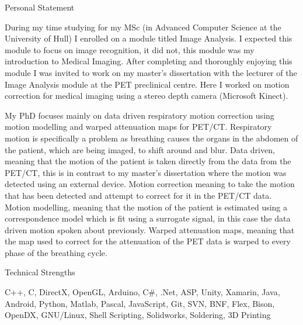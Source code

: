 \documentclass{cv}
\begin{document}
\begin{rSection}{Personal Statement}

\vspace{-0.2cm}

\item During my time studying for my MSc (in Advanced Computer Science at the University of Hull) I enrolled on a module titled Image Analysis. I expected this module to focus on image recognition, it did not, this module was my introduction to Medical Imaging. After completing and thoroughly enjoying this module I was invited to work on my master’s dissertation with the lecturer of the Image Analysis module at the PET preclinical centre. Here I worked on motion correction for medical imaging using a stereo depth camera (Microsoft Kinect).

\item My PhD focuses mainly on data driven respiratory motion correction using motion modelling and warped attenuation maps for PET/CT. Respiratory motion is specifically a problem as breathing causes the organs in the abdomen of the patient, which are being imaged, to shift around and blur. Data driven, meaning that the motion of the patient is taken directly from the data from the PET/CT, this is in contrast to my master’s dissertation where the motion was detected using an external device. Motion correction meaning to take the motion that has been detected and attempt to correct for it in the PET/CT data. Motion modelling, meaning that the motion of the patient is estimated using a correspondence model which is fit using a surrogate signal, in this case the data driven motion spoken about previously. Warped attenuation maps, meaning that the map used to correct for the attenuation of the PET data is warped to every phase of the breathing cycle.
\end{rSection}

\begin{rSection}{Technical Strengths}

\vspace{-0.2cm}

\item C++, C, DirectX, OpenGL, Arduino, C\#, .Net, ASP, Unity, Xamarin, Java, Android, Python, Matlab, Pascal, JavaScript, Git, SVN, BNF,  Flex, Bison, OpenDX, GNU/Linux, Shell Scripting, Solidworks, Soldering, 3D Printing
\end{rSection}
\end{document}
